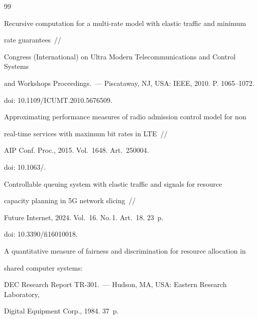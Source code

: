 {{\begin{thebibliography}{99}




Recursive computation for a multi-rate model with elastic traffic and minimum 


rate guarantees~/\!\!/


Congress (International) on Ultra Modern Telecommunications and Control Systems 


and Workshops Proceedings.~--- Piscataway, NJ, USA: IEEE, 2010. P. 1065--1072.


doi: 10.1109\!/\!ICUMT.2010.5676509.









Approximating performance measures of radio admission control model for non 


real-time services with maximum bit rates in LTE~/\!\!/


AIP Conf. Proc., 2015. Vol.~1648. Art.~250004.


doi: 10.1063\!/.









Controllable queuing system with elastic traffic and signals for resource 


capacity planning in 5G network slicing~/\!\!/


Future Internet, 2024. Vol.~16. No.\,1. Art.~18. 23~p.


doi: 10.3390\!/\!fi16010018.









A quantitative measure of fairness and discrimination for resource allocation in 


shared computer systems:


DEC Research Report TR-301.~--- Hudson, MA, USA: Eastern Research Laboratory, 


Digital Equipment Corp., 1984. 37~p.


   \end{thebibliography}


} }











